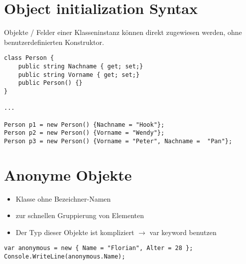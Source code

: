 \section{Object initialization Syntax}

Objekte / Felder einer Klasseninstanz können direkt zugewiesen werden, ohne benutzerdefinierten Konstruktor.
\begin{lstlisting}[language={[Sharp]C}]
class Person { 
	public string Nachname { get; set;} 
	public string Vorname { get; set;} 
	public Person() {} 
}

...

Person p1 = new Person() {Nachname = "Hook"}; 
Person p2 = new Person() {Vorname = "Wendy"}; 
Person p3 = new Person() {Vorname = "Peter", Nachname =  "Pan"};
\end{lstlisting}

\section{Anonyme Objekte}

\begin{itemize}
\item Klasse ohne Bezeichner-Namen
\item zur schnellen Gruppierung von Elementen 
\item Der Typ dieser Objekte ist kompliziert $\to$ var keyword benutzen
\end{itemize}

\begin{lstlisting}[language={[Sharp]C}]
var anonymous = new { Name = "Florian", Alter = 28 };
Console.WriteLine(anonymous.Name);
\end{lstlisting}